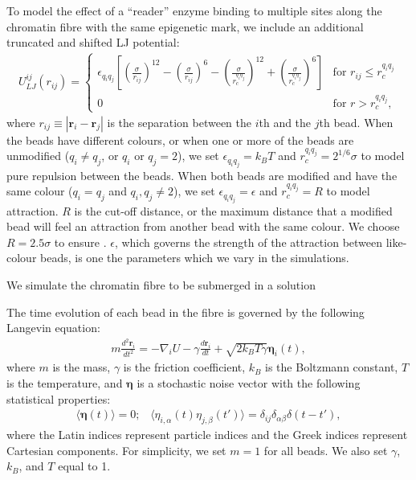 \documentclass[12pt]{article}
\newcommand{\abs}[1]{\left|#1\right|}
\begin{document}
To model the effect of a ``reader'' enzyme binding to multiple sites along the chromatin fibre with the same epigenetic mark, we include an additional truncated and shifted LJ potential:
\begin{eqnarray}
U_{LJ}^{ij}(r_{ij}) = \left\{ 
	\begin{array}{ll}
	\epsilon_{q_iq_j} \left[ \left(\frac{\sigma}{r_{ij}}\right)^{12}-\left(\frac{\sigma}{r_{ij}}\right)^{6}-\left(\frac{\sigma}{r_c^{q_iq_j}}\right)^{12}+\left(\frac{\sigma}{r_c^{q_iq_j}}\right)^{6}\right] & \textrm{for $r_{ij} \le r_c^{q_iq_j}$}\\
	0 & \textrm{for $r > r_c^{q_iq_j}$},
	\end{array}
\right.
\end{eqnarray}
where $r_{ij} \equiv \abs{\bm{r}_i - \bm{r}_j}$ is the separation between the $i$th and the $j$th bead. When the beads have different colours, or when one or more of the beads are unmodified ($q_i \neq q_j$, or $q_i$ or $q_j = 2$), we set $\epsilon_{q_iq_j} = k_BT$ and $r_c^{q_iq_j} = 2^{1/6}\sigma$ to model pure repulsion between the beads. When both beads are modified and have the same colour ($q_i = q_j$ and $q_i, q_j \neq 2$), we set $\epsilon_{q_iq_j}= \epsilon$ and $r_c^{q_iq_j} = R$ to model attraction. $R$ is the cut-off distance, or the maximum distance that a modified bead will feel an attraction from another bead with the same colour. We choose $R = 2.5\sigma$ to ensure  . $\epsilon$, which governs the strength of the attraction between like-colour beads, is one the parameters which we vary in the simulations. 

We simulate the chromatin fibre to be submerged in a solution 

The time evolution of each bead in the fibre is governed by the following Langevin equation:
\begin{eqnarray}
m\frac{d^2\bm{r}_i}{dt^2} = - \nabla_i U - \gamma \frac{d\bm{r}_i}{dt} + \sqrt{2k_BT\gamma}\bm{\eta}_i(t),
\end{eqnarray}
where $m$ is the mass, $\gamma$ is the friction coefficient, $k_B$ is the Boltzmann constant, $T$ is the temperature, and $\bm{\eta}$ is a stochastic noise vector with the following statistical properties:
\begin{eqnarray}
\langle\bm{\eta}(t)\rangle = 0;\;\;\; \langle\eta_{i,\alpha}(t)\eta_{j,\beta}(t')\rangle = \delta_{ij}\delta_{\alpha\beta}\delta(t-t'),
\end{eqnarray}
where the Latin indices represent particle indices and the Greek indices represent Cartesian components. For simplicity, we set $m = 1$ for all beads. We also set $\gamma$, $k_B$, and $T$ equal to 1. 
\end{document}
